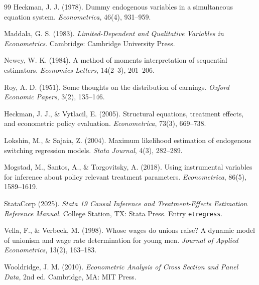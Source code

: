 \documentclass[11pt,a4paper]{article}
\theoremstyle{plain}
\theoremstyle{definition}
\theoremstyle{remark}
\newcommand{\1}{\mathbf{1}}
\newcommand{\cmd}[1]{\texttt{#1}}
\begin{document}
\begin{thebibliography}{99}
 Heckman, J. J. (1978). Dummy endogenous
variables in a simultaneous equation system. \textit{Econometrica}, 46(4),
931--959.

 Maddala, G. S. (1983).
\textit{Limited-Dependent and Qualitative Variables in Econometrics}.
Cambridge: Cambridge University Press.

 Newey, W. K. (1984). A method of moments
interpretation of sequential estimators. \textit{Economics Letters}, 14(2--3),
201--206.

 Roy, A. D. (1951). Some thoughts on the
distribution of earnings. \textit{Oxford Economic Papers}, 3(2), 135--146.

 Heckman, J. J., \&
Vytlacil, E. (2005). Structural equations, treatment effects, and econometric
policy evaluation. \textit{Econometrica}, 73(3), 669--738.

 Lokshin, M., \& Sajaia, Z.
(2004). Maximum likelihood estimation of endogenous switching regression
models. \textit{Stata Journal}, 4(3), 282--289.

 Mogstad, M., Santos, A., \&
Torgovitsky, A. (2018). Using instrumental variables for inference about
policy relevant treatment parameters. \textit{Econometrica}, 86(5),
1589--1619.

 StataCorp (2025). \textit{Stata 19
Causal Inference and Treatment-Effects Estimation Reference Manual}. College
Station, TX: Stata Press. Entry \cmd{etregress}.

 Vella, F., \& Verbeek, M. (1998).
Whose wages do unions raise? A dynamic model of unionism and wage rate
determination for young men. \textit{Journal of Applied Econometrics},
13(2), 163--183.

 Wooldridge, J. M. (2010).
\textit{Econometric Analysis of Cross Section and Panel Data}, 2nd ed.
Cambridge, MA: MIT Press.

\end{thebibliography}
\end{document}
